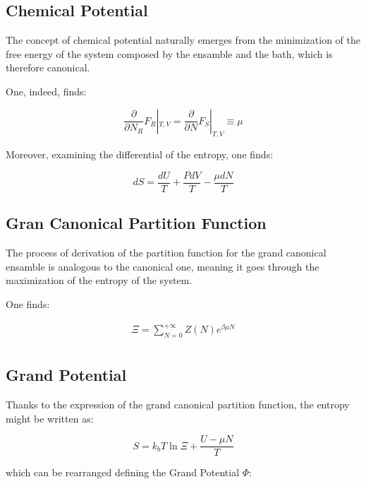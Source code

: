 \documentclass{article}
\begin{document}
\subsection{Chemical Potential}

The concept of chemical potential naturally emerges from the minimization of the free energy
of the system composed by the ensamble and the bath, which is therefore canonical.

One, indeed, finds:

\begin{equation}
    \frac{\partial}{\partial N_R}F_R|_{T,V}=\frac{\partial}{\partial N}F_S|_{T,V}\equiv \mu
\end{equation}

Moreover, examining the differential of the entropy, one finds:

\begin{equation}
    dS=\frac{dU}{T}+\frac{PdV}{T}-\frac{\mu dN}{T}
\end{equation}


\subsection{Gran Canonical Partition Function}

The process of derivation of the partition function for the grand canonical ensamble is analogous to the canonical one,
meaning it goes through the maximization of the entropy of the system.

One finds:

\begin{equation}
    \begin{aligned}
        \Xi= \sum_{N=0}^{+\infty}Z(N)e^{\beta\mu N} \\
    \end{aligned}
\end{equation}

\subsection{Grand Potential}

Thanks to the expression of the grand canonical partition function, the
entropy might be written as:

\begin{equation}
    S= k_bT\ln{\Xi}+\frac{U-\mu N}{T}
\end{equation}

which can be rearranged defining the Grand Potential $\Phi$:
\end{document}
